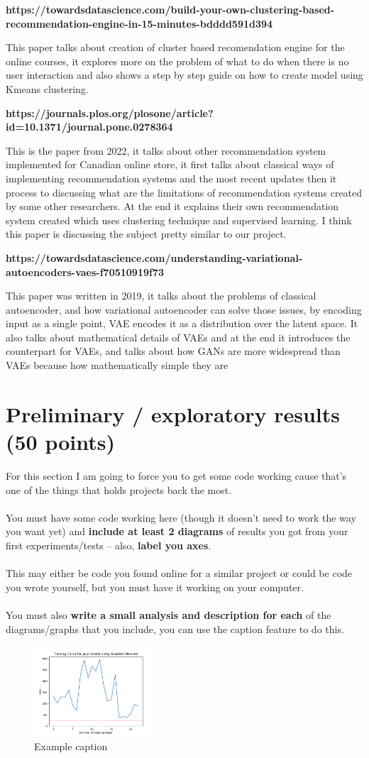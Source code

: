 \documentclass{article}
\begin{document}
\textbf{https://towardsdatascience.com/build-your-own-clustering-based-recommendation-engine-in-15-minutes-bdddd591d394}

This paper talks about creation of cluster based recomendation engine for the online courses, it explores more on the problem of what to do when there is no user interaction and also shows a step by step guide on how to create model using Kmeans clustering.

\textbf{https://journals.plos.org/plosone/article?id=10.1371/journal.pone.0278364}

This is the paper from 2022, it talks about other recommendation system implemented for Canadian online store, it first talks about classical ways of implementing recommendation systems and the most recent updates then it process to discussing what are the limitations of recommendation systems created by some other researchers. At the end it explains their own recommendation system created which uses clustering technique and supervised learning. I think this paper is discussing the subject pretty similar to our project.

\textbf{https://towardsdatascience.com/understanding-variational-autoencoders-vaes-f70510919f73}

This paper was written in 2019, it talks about the problems of classical autoencoder, and how variational autoencoder can solve those issues, by encoding input as a single point, VAE encodes it as a distribution over the latent space. It also talks about mathematical details of VAEs and at the end it introduces the counterpart for VAEs, and talks about  how GANs are more widespread than VAEs because how mathematically simple they are
\section{Preliminary / exploratory results (50 points)}

For this section I am going to force you to get some code working cause that's one of the things that holds projects back the most. \\ \\
You must have some code working here (though it doesn't need to work the way you want yet) and \textbf{include at least 2 diagrams} of results you got from your first experiments/tests -- also, \textbf{label you axes}. \\ \\
This may either be code you found online for a similar project or could be code you wrote yourself, but you must have it working on your computer. \\ \\
You must also \textbf{write a small analysis and description for each} of the diagrams/graphs that you include, you can use the caption feature to do this.

\begin{figure}[htb]
    \centering
    \includegraphics[width=0.4\textwidth]{Figs/Example training.png}
    \caption{ Example caption}
    \label{fig:net}
\end{figure}
\end{document}
